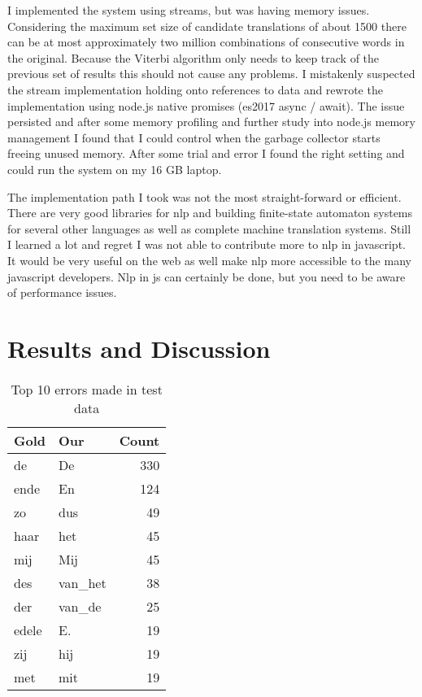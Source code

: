 \documentclass[11pt]{article}
\begin{document}
I implemented the system using streams, but was having memory issues. Considering the maximum set size of candidate translations of about 1500 there can be at most approximately two million combinations of consecutive words in the original. Because the Viterbi algorithm only needs to keep track of the previous set of results this should not cause any problems. I mistakenly suspected the stream implementation holding onto references to data and rewrote the implementation using node.js native promises (es2017 async / await). The issue persisted and after some memory profiling and further study into node.js memory management I found that I could control when the garbage collector starts freeing unused memory. After some trial and error I found the right setting and could run the system on my 16 GB laptop.

The implementation path I took was not the most straight-forward or efficient. There are very good libraries for nlp and building finite-state automaton systems for several other languages as well as complete machine translation systems. Still I learned a lot and regret I was not able to contribute more to nlp in javascript. It would be very useful on the web as well make nlp more accessible to the many javascript developers. Nlp in js can certainly be done, but you need to be aware of performance issues.

\section{Results and Discussion}

\begin{table}[ht]
  \centering
  \caption{Top 10 errors made in test data}
  \label{table:errors}
  \begin{tabular}{l l r }
    Gold & Our & Count \\
    \hline
    de & De &	330 \\
    ende & En & 124 \\
    zo & dus & 49 \\
    haar & het & 45 \\
    mij & Mij & 45 \\
    des & van\_het & 38 \\
    der	& van\_de & 25 \\
    edele & E. & 19 \\
    zij & hij & 19 \\
    met & mit & 19 \\
  \end{tabular}
\end{table}
\end{document}
